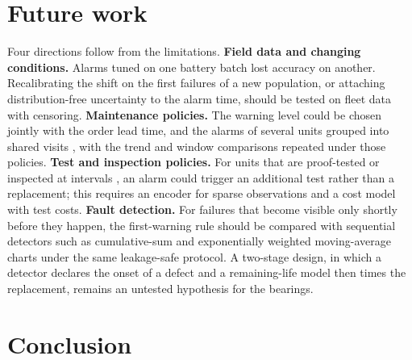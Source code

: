 \documentclass[a4paper,fleqn,doubleblind]{cas-dc}
\begin{document}
\section{Future work}\label{sec:8}

Four directions follow from the limitations. \textbf{Field data and changing conditions.} Alarms tuned on one battery batch lost accuracy on another. Recalibrating the shift on the first failures of a new population, or attaching distribution-free uncertainty to the alarm time, should be tested on fleet data with censoring. \textbf{Maintenance policies.} The warning level could be chosen jointly with the order lead time, and the alarms of several units grouped into shared visits \cite{depater2022,mitici2023}, with the trend and window comparisons repeated under those policies. \textbf{Test and inspection policies.} For units that are proof-tested or inspected at intervals \cite{dejonge2020}, an alarm could trigger an additional test rather than a replacement; this requires an encoder for sparse observations and a cost model with test costs. \textbf{Fault detection.} For failures that become visible only shortly before they happen, the first-warning rule should be compared with sequential detectors such as cumulative-sum and exponentially weighted moving-average charts \cite{page1954,roberts1959} under the same leakage-safe protocol. A two-stage design, in which a detector declares the onset of a defect and a remaining-life model then times the replacement, remains an untested hypothesis for the bearings.

\section{Conclusion}\label{sec:9}
\end{document}
